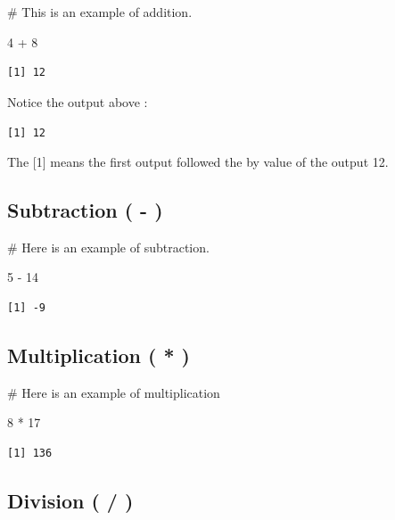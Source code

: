 \documentclass[
  letterpaper,
  DIV=11,
  numbers=noendperiod]{scrreprt}
\newenvironment{Shaded}{\begin{snugshade}}{\end{snugshade}}
\newcommand{\CommentTok}[1]{\textcolor[rgb]{0.37,0.37,0.37}{#1}}
\newcommand{\DecValTok}[1]{\textcolor[rgb]{0.68,0.00,0.00}{#1}}
\newcommand{\SpecialCharTok}[1]{\textcolor[rgb]{0.37,0.37,0.37}{#1}}
\begin{document}
\begin{Shaded}
\begin{Highlighting}[]
\CommentTok{\# This is an example of addition.}

\DecValTok{4} \SpecialCharTok{+} \DecValTok{8}
\end{Highlighting}
\end{Shaded}

\begin{verbatim}
[1] 12
\end{verbatim}

Notice the output above :

\texttt{{[}1{]}\ 12}

The {[}1{]} means the first output followed the by value of the output
12.

\subsection*{Subtraction ( - )}\label{subtraction--}

\begin{Shaded}
\begin{Highlighting}[]
\CommentTok{\# Here is an example of subtraction.}

\DecValTok{5} \SpecialCharTok{{-}} \DecValTok{14}
\end{Highlighting}
\end{Shaded}

\begin{verbatim}
[1] -9
\end{verbatim}

\subsection*{Multiplication ( * )}\label{multiplication}

\begin{Shaded}
\begin{Highlighting}[]
\CommentTok{\# Here is an example of multiplication}

\DecValTok{8} \SpecialCharTok{*} \DecValTok{17}
\end{Highlighting}
\end{Shaded}

\begin{verbatim}
[1] 136
\end{verbatim}

\subsection*{Division ( / )}\label{division}
\end{document}
